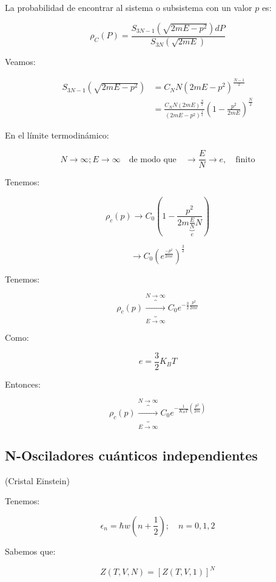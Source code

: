 \documentclass{article}
\begin{document}
La probabilidad de encontrar al sistema o subsistema con un valor $p$ es:


\[ \rho_{C}(P) = \frac{ S_{3N-1} \left( \sqrt{ 2mE-p^{2} }  \right)dP  }{S_{3N} \left( \sqrt{2mE }  \right) } \]


Veamos:

\begin{equation}
\begin{split}
 S_{3N-1} \left(  \sqrt{2mE-p^{2} }  \right) &= C_{N}N\left( 2mE-p^{2} \right)^{ \frac{N-1}{2} }  \\ 
 &= \frac{ C_{N}N(2mE)^{\frac{N}{2}} }{(2mE-p^{2})^{\frac{1}{2}}} \left( 1 -  \frac{p^{2}}{2mE} \right)^{\frac{N}{2}} 
\end{split}
\end{equation}



En el límite termodinámico:

\[ N \to \infty; E \to \infty \quad \text{de modo que} \quad \to \frac{E}{N} \to e, \quad \text{finito}\]


Tenemos:


\[ \rho_{c}(p) \longrightarrow C_{0} \left(1- \frac{p^{2}}{2m\underbrace{\frac{E}{N}}_{e}N} \right)  \]

\[\to C_{0}\left( e^{\frac{-p^{2}}{2me}}\right)^{\frac{3}{2}}\]


Tenemos:



\[ \rho_{c}(p) \underbrace{\overbrace{\longrightarrow}^{N \to \infty}}_{E\to \infty} C_{0}e^{- \frac{3}{2}\frac{p^{2}}{2me}}  \]

Como:


\[ \boxed{e=\frac{3}{2} K_{B}T } \]

Entonces:


\[  \rho_{c}(p)  \underbrace{\overbrace{\longrightarrow}^{N \to \infty}}_{E\to \infty} C_{0}e^{ - \frac{1}{K_{B}T} \left( \frac{p^{2}}{2m}\right) } \]


\subsection{N-Osciladores cuánticos independientes}

(Cristal Einstein)


Tenemos:

\[ \epsilon_{n} = \hbar w \left( n+\frac{1}{2}   \right); \quad n=0,1,2     \]

Sabemos que:

\[ Z(T,V,N) = \left[ Z(T,V,1)  \right]^{N} \]
\end{document}
